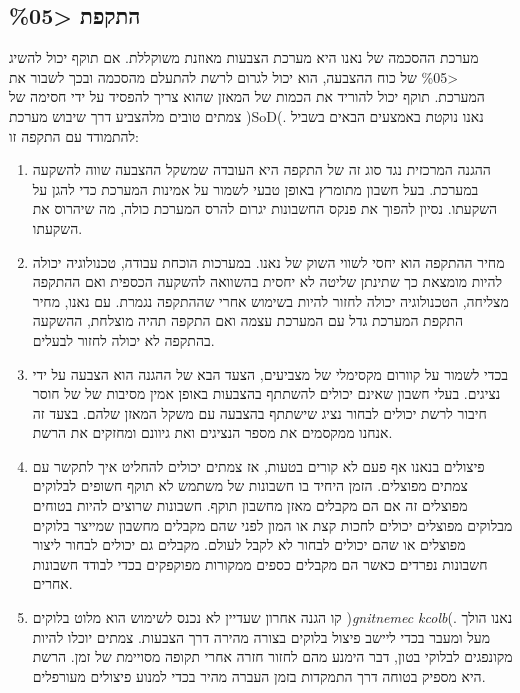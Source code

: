 \subsection{התקפת \textless \%05} \label{sec:attack_50}
מערכת ההסכמה של נאנו היא מערכת הצבעות מאוזנת משוקללת. אם תוקף יכול להשיג \textless \%05 של כוח ההצבעה, הוא יכול לגרום לרשת להתעלם מהסכמה ובכך לשבור את המערכת.  תוקף יכול להוריד את הכמות של המאזן שהוא צריך להפסיד על ידי חסימה של צמתים טובים מלהצביע דרך שיבוש מערכת )SoD(. נאנו נוקטת באמצעים הבאים בשביל להתמודד עם התקפה זו:
\begin{enumerate}
  \item 
	ההגנה המרכזית נגד סוג זה של התקפה היא העובדה שמשקל ההצבעה שווה להשקעה במערכת. 
בעל חשבון מתומרץ באופן טבעי לשמור על אמינות המערכת כדי להגן על השקעתו. נסיון להפוך את פנקס החשבונות יגרום להרס המערכת כולה, מה שיהרוס את השקעתו.
  
  \item	מחיר ההתקפה הוא יחסי לשווי השוק של נאנו. במערכות הוכחת עבודה, טכנולוגיה יכולה להיות מומצאת כך שתינתן שליטה לא יחסית בהשוואה להשקעה הכספית ואם ההתקפה מצליחה, הטכנולוגיה יכולה לחזור להיות בשימוש אחרי שההתקפה נגמרת. עם נאנו, מחיר התקפת המערכת גדל עם המערכת עצמה ואם התקפה תהיה מוצלחת, ההשקעה בהתקפה לא יכולה לחזור לבעלים.

  \item	בכדי לשמור על קוורום מקסימלי של מצביעים, הצעד הבא של ההגנה הוא הצבעה על ידי נציגים. בעלי חשבון שאינם יכולים להשתתף בהצבעות באופן אמין מסיבות של של חוסר חיבור לרשת יכולים לבחור נציג שישתתף בהצבעה עם משקל המאזן שלהם. בצעד זה אנחנו ממקסמים את מספר הנציגים ואת גיוונם ומחזקים את הרשת.
  
  \item	פיצולים בנאנו אף פעם לא קורים בטעות, אז צמתים יכולים להחליט איך לתקשר עם צמתים מפוצלים. הזמן היחיד בו חשבונות של משתמש לא תוקף חשופים לבלוקים מפוצלים זה אם הם מקבלים מאזן מחשבון תוקף. חשבונות שרוצים להיות בטוחים מבלוקים מפוצלים יכולים לחכות קצת או המון לפני שהם מקבלים מחשבון שמייצר בלוקים מפוצלים או שהם יכולים לבחור לא לקבל לעולם. מקבלים גם יכולים לבחור ליצור חשבונות נפרדים כאשר הם מקבלים כספים ממקורות מפוקפקים בכדי לבודד חשבונות אחרים.
  
  \item	קו הגנה אחרון שעדיין לא נכנס לשימוש הוא מלוט בלוקים )\textit{gnitnemec kcolb}(. נאנו הולך מעל ומעבר בכדי ליישב פיצול בלוקים בצורה מהירה דרך הצבעות. צמתים יוכלו להיות מקונפגים לבלוקי בטון, דבר הימנע מהם לחזור חזרה אחרי תקופה מסויימת של זמן. הרשת היא מספיק בטוחה דרך התמקדות בזמן העברה מהיר בכדי למנוע פיצולים מעורפלים.
\end{enumerate}

